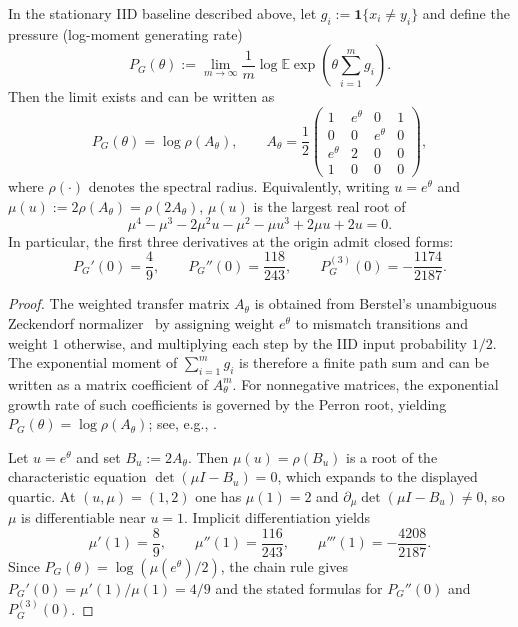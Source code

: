 \begin{proposition}\label{prop:gauge-anomaly-pressure}
In the stationary IID baseline described above, let $g_i:=\mathbf 1\{x_i\neq y_i\}$ and define the pressure (log-moment generating rate)
\[
P_G(\theta):=\lim_{m\to\infty}\frac1m\log \mathbb E\exp\!\left(\theta\sum_{i=1}^{m} g_i\right).
\]
Then the limit exists and can be written as
\[
P_G(\theta)=\log\rho(A_\theta),\qquad
A_\theta=\frac12\begin{pmatrix}
1 & e^\theta & 0 & 1\\
0 & 0 & e^\theta & 0\\
e^\theta & 2 & 0 & 0\\
1 & 0 & 0 & 0
\end{pmatrix},
\]
where $\rho(\cdot)$ denotes the spectral radius.
Equivalently, writing $u=e^\theta$ and $\mu(u):=2\rho(A_\theta)=\rho(2A_\theta)$, $\mu(u)$ is the largest real root of
\[
\mu^{4} - \mu^{3} - 2 \mu^{2} u - \mu^{2} - \mu u^{3} + 2 \mu u + 2 u=0.
\]
In particular, the first three derivatives at the origin admit closed forms:
\[
P_G'(0)=\frac{4}{9},\qquad P_G''(0)=\frac{118}{243},\qquad P_G^{(3)}(0)=- \frac{1174}{2187}.
\]
\end{proposition}
\begin{proof}
The weighted transfer matrix $A_\theta$ is obtained from Berstel's unambiguous Zeckendorf normalizer~\cite{ITA_2001__35_6_491_0} by assigning weight $e^\theta$ to mismatch transitions and weight $1$ otherwise, and multiplying each step by the IID input probability $1/2$.
The exponential moment of $\sum_{i=1}^{m}g_i$ is therefore a finite path sum and can be written as a matrix coefficient of $A_\theta^m$.
For nonnegative matrices, the exponential growth rate of such coefficients is governed by the Perron root, yielding $P_G(\theta)=\log\rho(A_\theta)$; see, e.g., \cite[Chapter~4]{LindMarcus1995}.

Let $u=e^\theta$ and set $B_u:=2A_\theta$.
Then $\mu(u)=\rho(B_u)$ is a root of the characteristic equation $\det(\mu I-B_u)=0$, which expands to the displayed quartic.
At $(u,\mu)=(1,2)$ one has $\mu(1)=2$ and $\partial_\mu \det(\mu I-B_u)\neq 0$, so $\mu$ is differentiable near $u=1$.
Implicit differentiation yields
\[
\mu'(1)=\frac{8}{9},\qquad
\mu''(1)=\frac{116}{243},\qquad
\mu'''(1)=-\frac{4208}{2187}.
\]
Since $P_G(\theta)=\log(\mu(e^\theta)/2)$, the chain rule gives
$P_G'(0)=\mu'(1)/\mu(1)=4/9$ and the stated formulas for $P_G''(0)$ and $P_G^{(3)}(0)$.
\end{proof}

